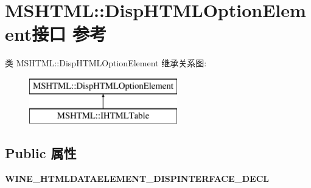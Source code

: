 \hypertarget{interface_m_s_h_t_m_l_1_1_disp_h_t_m_l_option_element}{}\section{M\+S\+H\+T\+ML\+:\+:Disp\+H\+T\+M\+L\+Option\+Element接口 参考}
\label{interface_m_s_h_t_m_l_1_1_disp_h_t_m_l_option_element}
类 M\+S\+H\+T\+ML\+:\+:Disp\+H\+T\+M\+L\+Option\+Element 继承关系图\+:\begin{figure}[H]
\begin{center}
\leavevmode
\includegraphics[height=2.000000cm]{interface_m_s_h_t_m_l_1_1_disp_h_t_m_l_option_element}
\end{center}
\end{figure}
\subsection*{Public 属性}
\begin{DoxyCompactItemize}
\item 
\mbox{\label{interface_m_s_h_t_m_l_1_1_disp_h_t_m_l_option_element_afb3b8396d870d6f1b652b231e23e9518}} 
{\bfseries W\+I\+N\+E\+\_\+\+H\+T\+M\+L\+D\+A\+T\+A\+E\+L\+E\+M\+E\+N\+T\+\_\+\+D\+I\+S\+P\+I\+N\+T\+E\+R\+F\+A\+C\+E\+\_\+\+D\+E\+CL}
\end{DoxyCompactItemize}
